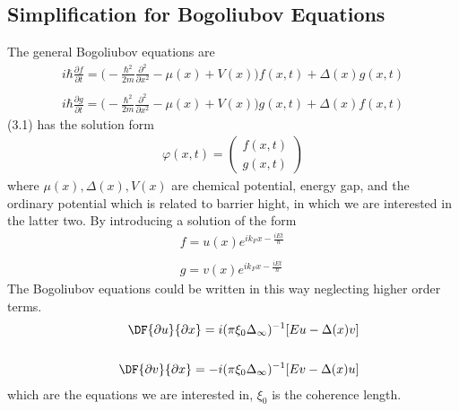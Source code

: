 \subsection{Simplification for Bogoliubov Equations}
The general Bogoliubov equations are 
\begin{eqnarray}
i\hbar\frac{\partial f}{\partial t} = \Big(-\frac{\hbar^2}{2m}\frac{\partial^2}{\partial {x^2}}-\mu(x)+V(x)\Big)f(x,t)+\Delta(x)g(x,t)\nonumber\\
\\
i\hbar\frac{\partial g}{\partial t} = \Big(-\frac{\hbar^2}{2m}\frac{\partial^2}{\partial {x^2}}-\mu(x)+V(x)\Big)g(x,t)+\Delta(x)f(x,t)\nonumber
\end{eqnarray}
(3.1) has the solution form 
\begin{eqnarray}
\varphi(x,t)=
\left(\begin{array}{c}
f(x,t)\\
g(x,t)
\end{array}\right)
\end{eqnarray}
where $\mu(x),\Delta(x),V(x)$ are chemical potential, energy gap, and the ordinary potential which is related to barrier hight, in which we are interested in the latter two.
By introducing a solution of the form
\begin{eqnarray}
f=u(x)e^{ik_Fx-\frac{iEt}{\hbar}}\nonumber\\
\\
g=v(x)e^{ik_Fx-\frac{iEt}{\hbar}}\nonumber\
\end{eqnarray}
The Bogoliubov equations could be written in this way neglecting higher order terms\citep{Reference4}.
\begin{eqnarray}
&&\DF{\partial u}{\partial x}=i(\pi \xi_0\Delta_{\infty})^{-1}[Eu-\Delta(x)v]\nonumber\\
&&\\
&&\DF{\partial v}{\partial x}=-i(\pi \xi_0\Delta_{\infty})^{-1}[Ev-\Delta(x)u]\nonumber
\end{eqnarray}
which are the equations we are interested in, $\xi_0$ is the coherence length.

